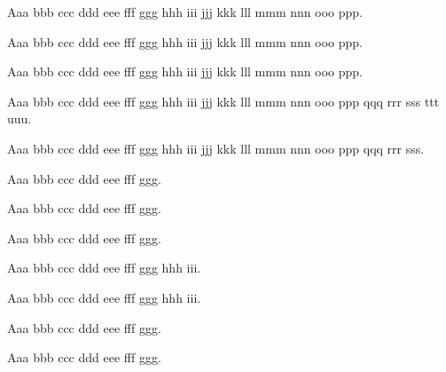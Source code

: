 \documentclass{article}
\begin{document}
Aaa bbb ccc ddd eee fff ggg hhh iii jjj kkk lll mmm nnn ooo ppp.

Aaa bbb ccc ddd eee fff ggg hhh iii jjj kkk lll mmm nnn ooo ppp.

Aaa bbb ccc ddd eee fff ggg hhh iii jjj kkk lll mmm nnn ooo ppp.



Aaa bbb ccc ddd eee fff ggg hhh iii jjj kkk lll mmm nnn ooo ppp qqq rrr sss ttt
uuu.

Aaa bbb ccc ddd eee fff ggg hhh iii jjj kkk lll mmm nnn ooo ppp qqq rrr sss.



Aaa bbb ccc ddd eee fff ggg.

Aaa bbb ccc ddd eee fff ggg.

Aaa bbb ccc ddd eee fff ggg.



Aaa bbb ccc ddd eee fff ggg hhh iii.

Aaa bbb ccc ddd eee fff ggg hhh iii.



Aaa bbb ccc ddd eee fff ggg.

Aaa bbb ccc ddd eee fff ggg.
\end{document}
